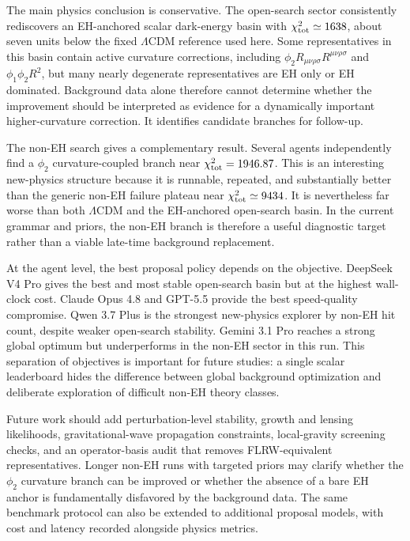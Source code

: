 \documentclass[aps,prd,twocolumn,superscriptaddress,nofootinbib,longbibliography]{revtex4-2}
\begin{document}
The main physics conclusion is conservative.  The open-search sector consistently rediscovers an EH-anchored scalar dark-energy basin with $\chi^2_{\rm tot}\simeq1638$, about seven units below the fixed $\Lambda$CDM reference used here.  Some representatives in this basin contain active curvature corrections, including $\phi_2R_{\mu\nu\rho\sigma}R^{\mu\nu\rho\sigma}$ and $\phi_1\phi_2R^2$, but many nearly degenerate representatives are EH only or EH dominated.  Background data alone therefore cannot determine whether the improvement should be interpreted as evidence for a dynamically important higher-curvature correction.  It identifies candidate branches for follow-up.

The non-EH search gives a complementary result.  Several agents independently find a $\phi_2$ curvature-coupled branch near $\chi^2_{\rm tot}=1946.87$.  This is an interesting new-physics structure because it is runnable, repeated, and substantially better than the generic non-EH failure plateau near $\chi^2_{\rm tot}\simeq9434$.  It is nevertheless far worse than both $\Lambda$CDM and the EH-anchored open-search basin.  In the current grammar and priors, the non-EH branch is therefore a useful diagnostic target rather than a viable late-time background replacement.

At the agent level, the best proposal policy depends on the objective.  DeepSeek V4 Pro gives the best and most stable open-search basin but at the highest wall-clock cost.  Claude Opus 4.8 and GPT-5.5 provide the best speed-quality compromise.  Qwen 3.7 Plus is the strongest new-physics explorer by non-EH hit count, despite weaker open-search stability.  Gemini 3.1 Pro reaches a strong global optimum but underperforms in the non-EH sector in this run.  This separation of objectives is important for future studies: a single scalar leaderboard hides the difference between global background optimization and deliberate exploration of difficult non-EH theory classes.

Future work should add perturbation-level stability, growth and lensing likelihoods, gravitational-wave propagation constraints, local-gravity screening checks, and an operator-basis audit that removes FLRW-equivalent representatives.  Longer non-EH runs with targeted priors may clarify whether the $\phi_2$ curvature branch can be improved or whether the absence of a bare EH anchor is fundamentally disfavored by the background data.  The same benchmark protocol can also be extended to additional proposal models, with cost and latency recorded alongside physics metrics.



\end{document}
